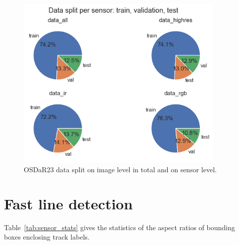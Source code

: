 \documentclass[Master,MDS,english]{BASE/twbook} %
\begin{document}
\begin{figure}[h]
\centering
\includegraphics[width=0.9\textwidth]{images/datasets/db/data_split}
\caption{OSDaR23 data split on image level in total and on sensor level. }
\label{fig:data_split}
\end{figure}

\section{Fast line detection}  \label{app:fld}

Table~\ref{tab:sensor_stats} gives the statistics of the aspect ratios of bounding boxes enclosing track labels.
\end{document}

